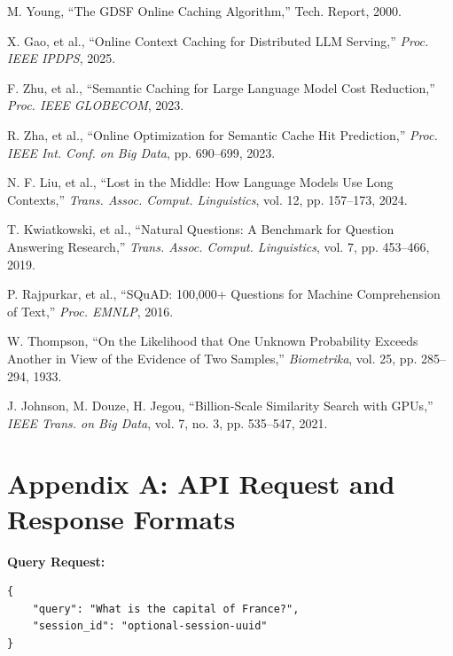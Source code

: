\documentclass[12pt,a4paper]{report}
\begin{document}
\begin{enumerate}[label={[\arabic*]}, leftmargin=1.5cm]
\item M. Young, ``The GDSF Online Caching Algorithm,'' Tech. Report, 2000.

\item X. Gao, et al., ``Online Context Caching for Distributed LLM Serving,'' \textit{Proc. IEEE IPDPS}, 2025.

\item F. Zhu, et al., ``Semantic Caching for Large Language Model Cost Reduction,'' \textit{Proc. IEEE GLOBECOM}, 2023.

\item R. Zha, et al., ``Online Optimization for Semantic Cache Hit Prediction,'' \textit{Proc. IEEE Int. Conf. on Big Data}, pp. 690--699, 2023.

\item N. F. Liu, et al., ``Lost in the Middle: How Language Models Use Long Contexts,'' \textit{Trans. Assoc. Comput. Linguistics}, vol. 12, pp. 157--173, 2024.

\item T. Kwiatkowski, et al., ``Natural Questions: A Benchmark for Question Answering Research,'' \textit{Trans. Assoc. Comput. Linguistics}, vol. 7, pp. 453--466, 2019.

\item P. Rajpurkar, et al., ``SQuAD: 100,000+ Questions for Machine Comprehension of Text,'' \textit{Proc. EMNLP}, 2016.

\item W. Thompson, ``On the Likelihood that One Unknown Probability Exceeds Another in View of the Evidence of Two Samples,'' \textit{Biometrika}, vol. 25, pp. 285--294, 1933.

\item J. Johnson, M. Douze, H. Jegou, ``Billion-Scale Similarity Search with GPUs,'' \textit{IEEE Trans. on Big Data}, vol. 7, no. 3, pp. 535--547, 2021.
\end{enumerate}


\newpage
\appendix
{}
\chapter*{Appendix A: API Request and Response Formats}

\textbf{Query Request:}
\begin{lstlisting}
{
    "query": "What is the capital of France?",
    "session_id": "optional-session-uuid"
}
\end{lstlisting}
\end{document}

